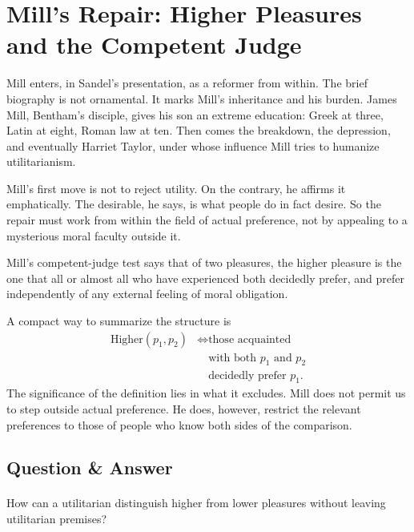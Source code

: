 \section{Mill's Repair: Higher Pleasures and the Competent Judge}

Mill enters, in Sandel's presentation, as a reformer from within. The brief biography is not ornamental. It marks Mill's inheritance and his burden. James Mill, Bentham's disciple, gives his son an extreme education: Greek at three, Latin at eight, Roman law at ten. Then comes the breakdown, the depression, and eventually Harriet Taylor, under whose influence Mill tries to humanize utilitarianism.

Mill's first move is not to reject utility. On the contrary, he affirms it emphatically. The desirable, he says, is what people do in fact desire. So the repair must work from within the field of actual preference, not by appealing to a mysterious moral faculty outside it.

\begin{definition}
Mill's competent-judge test says that of two pleasures, the higher pleasure is the one that all or almost all who have experienced both decidedly prefer, and prefer independently of any external feeling of moral obligation.
\end{definition}

A compact way to summarize the structure is
\begin{equation}
\begin{aligned}
\text{Higher}(p_1,p_2)
&\iff \text{those acquainted} \\
&\quad \text{with both }p_1\text{ and }p_2 \\
&\quad \text{decidedly prefer }p_1.
\end{aligned}
\end{equation}
The significance of the definition lies in what it excludes. Mill does not permit us to step outside actual preference. He does, however, restrict the relevant preferences to those of people who know both sides of the comparison.

\subsection{Question \& Answer}

\paragraph{}
How can a utilitarian distinguish higher from lower pleasures without leaving utilitarian premises?

